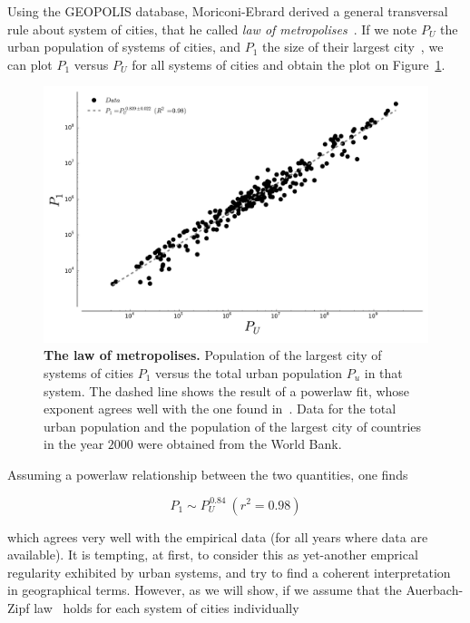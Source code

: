 Using the GEOPOLIS database, Moriconi-Ebrard derived a general transversal rule about system
of cities, that he called \emph{law of metropolises}~\cite{Pumain:1997}. If we
note $P_U$ the urban population of systems of cities, and $P_1$ the size of
their largest city~, we can
plot $P_1$ versus $P_U$ for all systems of cities and obtain the plot on
Figure~\ref{fig:metropolises}.

\begin{figure}[!h]
    \centering
    \includegraphics[width=\textwidth]{gfx/chapter-intro/law_metropolises.pdf}
    \caption{{\bf The law of metropolises.} Population of the largest city of
    systems of cities $P_1$ versus the total urban population $P_u$ in that
system. The dashed line shows the result of a powerlaw fit, whose exponent
agrees well with the one found in~\cite{Pumain:1997}. Data for the total urban
population and the population of the largest city of countries in the year
$2000$ were obtained from
the World Bank.\label{fig:metropolises}}
\end{figure}

Assuming a powerlaw relationship between the two quantities, one finds

\begin{equation}
    P_1 \sim P_U^{\,0.84}\:(r^2=0.98)
    \label{eq:metropolis}
\end{equation}

which agrees very well with the empirical data (for all years where data are
available). It is tempting, at first, to consider this as yet-another emprical
regularity exhibited by urban systems, and try to find a coherent interpretation
in geographical terms. However, as we will show, if we assume that the Auerbach-Zipf
law~\cite{Auerbach:1913,Zipf:1949} holds for each system of cities
individually


